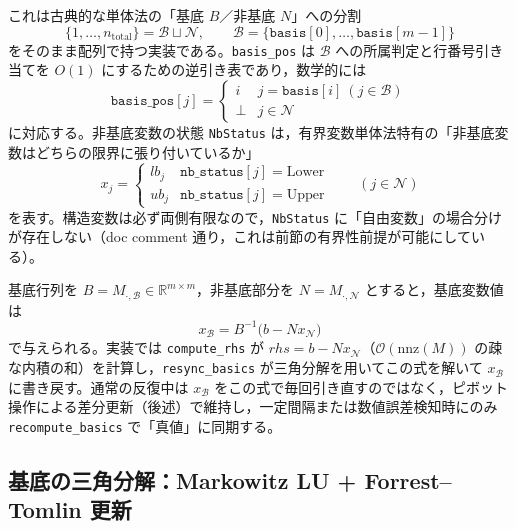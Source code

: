 \documentclass[11pt,a4paper]{ltjsarticle}
\newcommand{\R}{\mathbb{R}}
\newcommand{\code}[1]{\texttt{#1}}
\begin{document}
これは古典的な単体法の「基底 $B$／非基底 $N$」への分割
\[
  \{1,\dots,n_{\mathrm{total}}\} = \mathcal{B} \sqcup \mathcal{N}, \qquad
  \mathcal{B} = \{\code{basis}[0],\dots,\code{basis}[m-1]\}
\]
をそのまま配列で持つ実装である。\code{basis\_pos} は $\mathcal{B}$ への所属判定と行番号引き当てを $O(1)$ にするための逆引き表であり，数学的には
\[
  \code{basis\_pos}[j] = \begin{cases} i & j = \code{basis}[i] \ (j \in \mathcal{B})\\ \bot & j \in \mathcal{N}\end{cases}
\]
に対応する。非基底変数の状態 \code{NbStatus} は，有界変数単体法特有の「非基底変数はどちらの限界に張り付いているか」
\[
  x_j = \begin{cases} lb_j & \code{nb\_status}[j] = \mathrm{Lower} \\ ub_j & \code{nb\_status}[j] = \mathrm{Upper}\end{cases} \qquad (j \in \mathcal{N})
\]
を表す。構造変数は必ず両側有限なので，\code{NbStatus} に「自由変数」の場合分けが存在しない（doc comment 通り，これは前節の有界性前提が可能にしている）。

基底行列を $B = M_{\cdot,\mathcal{B}} \in \R^{m\times m}$，非基底部分を $N = M_{\cdot,\mathcal{N}}$ とすると，基底変数値は
\[
  x_{\mathcal B} = B^{-1}\bigl(b - N x_{\mathcal N}\bigr)
\]
で与えられる。実装では \code{compute\_rhs} が $rhs = b - N x_{\mathcal N}$（$\mathcal{O}(\mathrm{nnz}(M))$ の疎な内積の和）を計算し，\code{resync\_basics} が三角分解を用いてこの式を解いて $x_{\mathcal B}$ に書き戻す。通常の反復中は $x_{\mathcal B}$ をこの式で毎回引き直すのではなく，ピボット操作による差分更新（後述）で維持し，一定間隔または数値誤差検知時にのみ \code{recompute\_basics} で「真値」に同期する。

\subsection{基底の三角分解：Markowitz LU + Forrest--Tomlin 更新}
\end{document}
